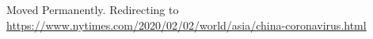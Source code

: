 Moved Permanently. Redirecting to
\url{https://www.nytimes.com/2020/02/02/world/asia/china-coronavirus.html}
